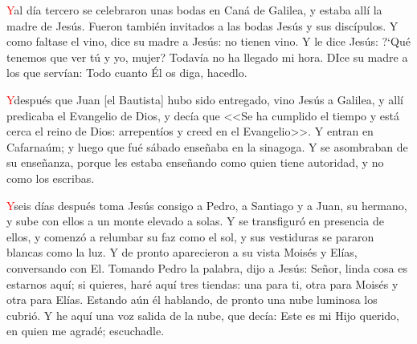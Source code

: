 \documentclass[10pt,twoside]{book}
\begin{document}


\vspace{1.5em}

\noindent{}
\lettrine[lines=2]{\textcolor{red}{Y}}\space al día tercero se celebraron unas bodas en Caná de Galilea, y estaba allí la madre de Jesús. Fueron también invitados a las bodas
Jesús y sus discípulos. Y como faltase el vino, dice su madre a Jesús: no tienen vino. Y le dice Jesús: {?`}Qué tenemos que ver tú y yo, mujer? Todavía no ha llegado mi hora.
DIce su madre a los que servían: Todo cuanto Él os diga, hacedlo.

\vspace{0.5em}



\vspace{1.5em}

\noindent{}
\lettrine[lines=2]{\textcolor{red}{Y}}\space después que Juan [el Bautista] hubo sido entregado, vino Jesús a Galilea, y allí predicaba el Evangelio de Dios, y decía que <<Se ha cumplido
el tiempo y está cerca el reino de Dios: arrepentíos y creed en el Evangelio>>. Y entran en Cafarnaúm; y luego que fué sábado enseñaba en la sinagoga. Y se asombraban de su
enseñanza, porque les estaba enseñando como quien tiene autoridad, y no como los escribas.

\vspace{0.5em}



\noindent{}
\lettrine[lines=2]{\textcolor{red}{Y}}\space seis días después toma Jesús consigo a Pedro, a Santiago y a Juan, su hermano, y sube con ellos a un monte elevado a solas. Y se transfiguró
en presencia de ellos, y comenzó a relumbar su faz como el sol, y sus vestiduras se pararon blancas como la luz. Y de pronto aparecieron a su vista Moisés y Elías, conversando con El.
Tomando Pedro la palabra, dijo a Jesús: Señor, linda cosa es estarnos aquí; si quieres, haré aquí tres tiendas: una para ti, otra para Moisés y otra para Elías. Estando aún él hablando,
de pronto una nube luminosa los cubrió. Y he aquí una voz salida de la nube, que decía: Este es mi Hijo querido, en quien me agradé; escuchadle.

\vspace{0.5em}
\end{document}
